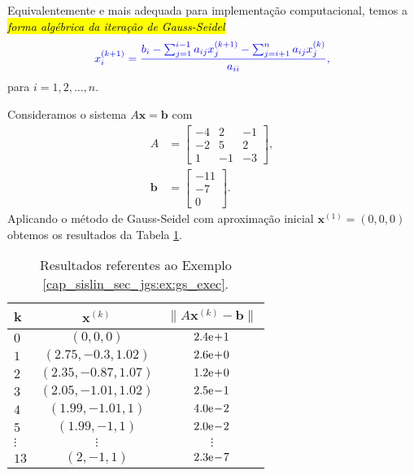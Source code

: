 Equivalentemente e mais adequada para implementação computacional, temos a \hl{\emph{forma algébrica da iteração de Gauss-Seidel}}
\begin{equation}\color{blue}x_i^{(k+1)} = \frac{{b_i - \sum_{j=1}^{i-1} a_{ij}x_j^{(k+1)} - \sum_{j=i+1}^{n} a_{ij}x_j^{(k)}}}{a_{ii}},
\end{equation}
para $i=1, 2, \dotsc, n$.

\begin{ex}\label{cap_sislin_sec_jgs:ex:gs_exec}
  Consideramos o sistema $A\pmb{x} = \pmb{b}$ com
  \begin{align}
    A &=
    \begin{bmatrix}
      -4 & 2 & -1 \\
      -2 & 5 & 2 \\
       1 & -1 & -3
    \end{bmatrix},\\
    \pmb{b} &=
    \begin{bmatrix}
      -11\\ -7\\ 0
    \end{bmatrix}.
  \end{align}
  Aplicando o método de Gauss-Seidel com aproximação inicial $\pmb{x}^{(1)} = (0, 0, 0)$ obtemos os resultados da Tabela \ref{cap_sislin_sec_jgs:tab:ex_gs_exec}.

  \begin{table}[H]
    \centering
    \caption{Resultados referentes ao Exemplo \ref{cap_sislin_sec_jgs:ex:gs_exec}.}
    \begin{tabular}{l|cc}
      k & $\pmb{x}^{(k)}$ & $\|A\pmb{x}^{(k)}-\pmb{b}\|$\\\hline
      $0$ & $(0, 0, 0)$  & $2.4\mathrm{e}\!+\!1$ \\
      $1$ & $(2.75, -0.3, 1.02)$ & $2.6\mathrm{e}\!+\!0$ \\
      $2$ & $(2.35, -0.87, 1.07)$ & $1.2\mathrm{e}\!+\!0$ \\
      $3$ & $(2.05, -1.01, 1.02)$ & $2.5\mathrm{e}\!-\!1$ \\
      $4$ & $(1.99, -1.01, 1)$ & $4.0\mathrm{e}\!-\!2$ \\
      $5$ & $(1.99, -1, 1)$ & $2.0\mathrm{e}\!-\!2$ \\
      $\vdots$ & $\vdots$  & $\vdots$ \\
      $13$ & $(2, -1, 1)$ & $2.3\mathrm{e}\!-\!7$ \\\hline
    \end{tabular}
    \label{cap_sislin_sec_jgs:tab:ex_gs_exec}
  \end{table}


\end{ex}
